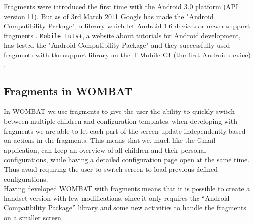 Fragments were introduced the first time with the Android 3.0 platform (API version 11). 
But as of 3rd March 2011 Google has made the "Android Compatibility Package", a library which let Android 1.6 devices or newer support fragments \cite{web:android:fragments:support}.
\texttt{Mobile tuts+}, a website about tutorials for Android development, has tested the "Android Compatibility Package" and they successfully used fragments with the support library on the T-Mobile G1 (the first Android device) \cite{web:android:fragments:compatibility}.
 
\subsection{Fragments in WOMBAT}
In WOMBAT we use fragments to give the user the ability to quickly switch between multiple children and configuration templates, when developing with fragments we are able to let each part of the screen update independently based on actions in the fragments.
This means that we, much like the Gmail application, can keep an overview of all children and their personal configurations, while having a detailed configuration page open at the same time.
Thus avoid requiring the user to switch screen to load previous defined configurations.\\

Having developed WOMBAT with fragments means that it is possible to create a handset version with few modifications, since it only requires the "`Android Compatibility Package"' library and some new activities to handle the fragments on a smaller screen.